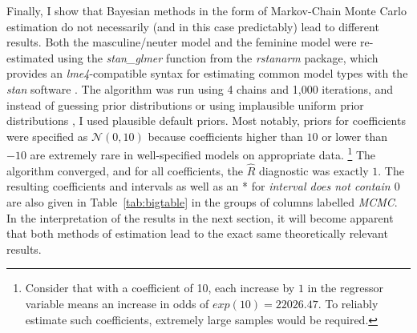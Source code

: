 \documentclass[USenglish]{article}
\begin{document}
Finally, I show that Bayesian methods in the form of Markov-Chain Monte Carlo estimation do not necessarily (and in this case predictably) lead to different results.
Both the masculine\slash neuter model and the feminine model were re-estimated using the \textit{stan\_glmer} function from the \textit{rstanarm} package, which provides an \textit{lme4}-compatible syntax for estimating common model types with the \textit{stan} software \citep{CarpenterEa2017}.
The algorithm was run using 4 chains and 1,000 iterations, and instead of guessing prior distributions or using implausible uniform prior distributions \cite[251--252]{Levshina2016}, I used plausible default priors.
Most notably, priors for coefficients were specified as $\mathcal{N}(0,10)$ because coefficients higher than $10$ or lower than $-10$ are extremely rare in well-specified models on appropriate data.%
\footnote{Consider that with a coefficient of 10, each increase by $1$ in the regressor variable means an increase in odds of $exp(10)=22026.47$.
To reliably estimate such coefficients, extremely large samples would be required.}
The algorithm converged, and for all coefficients, the $\hat{R}$ diagnostic was exactly $1$.
The resulting coefficients and intervals as well as an * for \textit{interval does not contain $0$} are also given in Table~\ref{tab:bigtable} in the groups of columns labelled \textit{MCMC}.
In the interpretation of the results in the next section, it will become apparent that both methods of estimation lead to the exact same theoretically relevant results.




%
%
%
\end{document}
